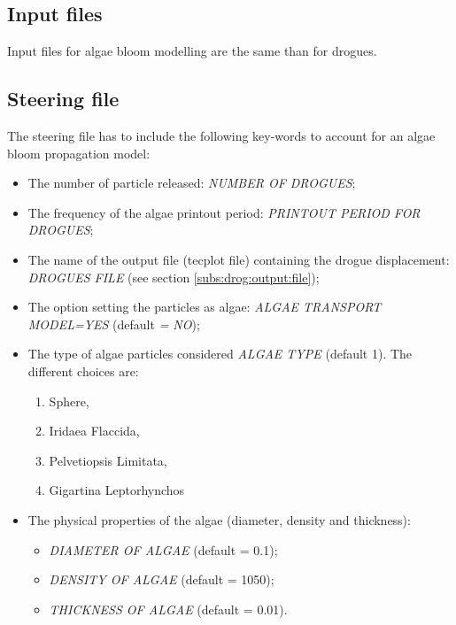 \subsection{Input files}

 Input files for algae bloom modelling are the same than for drogues.


\subsection{ Steering file}

 The steering file has to include the following key-words to account for an algae bloom propagation model:

\begin{itemize}
\item  The number of particle released: \textit{NUMBER OF DROGUES};

\item  The frequency of the algae printout period: \textit{PRINTOUT PERIOD FOR DROGUES};

\item  The name of the output file (tecplot file) containing the drogue displacement: \textit{DROGUES FILE} (see section \ref{subs:drog:output:file});

\item  The option setting the particles as algae: \textit{ALGAE TRANSPORT MODEL=YES} (default\textit{ = NO});

\item  The type of algae particles considered \textit{ALGAE TYPE} (default 1). The different choices are:

\begin{enumerate}
\item Sphere,

\item Iridaea Flaccida,

\item Pelvetiopsis Limitata,

\item Gigartina Leptorhynchos
\end{enumerate}

\item  The physical properties of the algae (diameter, density and thickness):

\begin{itemize}
\item  \textit{DIAMETER OF ALGAE} (default = 0.1);

\item  \textit{DENSITY OF ALGAE} (default = 1050);

\item  \textit{THICKNESS OF ALGAE} (default = 0.01).
\end{itemize}
\end{itemize}

